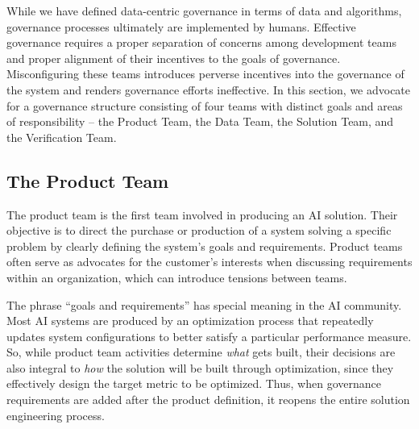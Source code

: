 While we have defined data-centric governance in terms of data and algorithms, governance processes ultimately are implemented by humans. Effective governance requires a proper separation of concerns among development teams and proper alignment of their incentives to the goals of governance. Misconfiguring these teams introduces perverse incentives into the governance of the system and renders governance efforts ineffective. In this section, we advocate for a governance structure consisting of four teams with distinct goals and areas of responsibility -- the Product Team, the Data Team, the Solution Team, and the Verification Team.

\subsection{The Product Team}

The product team is the first team involved in producing an AI solution. Their objective is to direct the purchase or production of a system solving a specific problem by clearly defining the system's goals and requirements. Product teams often serve as advocates for the customer's interests when discussing requirements within an organization, which can introduce tensions between teams. 




The phrase ``goals and requirements'' has special meaning in the AI community. Most AI systems are produced by an optimization process that repeatedly updates system configurations to better satisfy a particular performance measure. So, while product team activities determine \textit{what} gets built, their decisions are also integral to \textit{how} the solution will be built through optimization, since they effectively design the target metric to be optimized. Thus, when governance requirements are added after the product definition, it reopens the entire solution engineering process.

